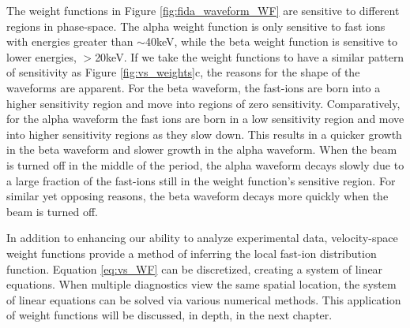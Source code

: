 The weight functions in Figure \ref{fig:fida_waveform_WF} are sensitive to different regions in phase-space. The alpha weight function is only sensitive to fast ions with energies greater than $\sim$40keV, while the beta weight function is sensitive to lower energies, $>$20keV. If we take the weight functions to have a similar pattern of sensitivity as Figure \ref{fig:vs_weights}c, the reasons for the shape of the waveforms are apparent. For the beta waveform, the fast-ions are born into a higher sensitivity region and move into regions of zero sensitivity. Comparatively, for the alpha waveform the fast ions are born in a low sensitivity region and move into higher sensitivity regions as they slow down. This results in a quicker growth in the beta waveform and slower growth in the alpha waveform. When the beam is turned off in the middle of the period, the alpha waveform decays slowly due to a large fraction of the fast-ions still in the weight function's sensitive region. For similar yet opposing reasons, the beta waveform decays more quickly when the beam is turned off.

In addition to enhancing our ability to analyze experimental data, velocity-space weight functions provide a method of inferring the local fast-ion distribution function\cite{salewski2013_tomography,salewski2014_tomography}. Equation \ref{eq:vs_WF} can be discretized, creating a system of linear equations. When multiple diagnostics view the same spatial location, the system of linear equations can be solved via various numerical methods\cite{jacobsen_stagner2016}. This application of weight functions will be discussed, in depth, in the next chapter.

